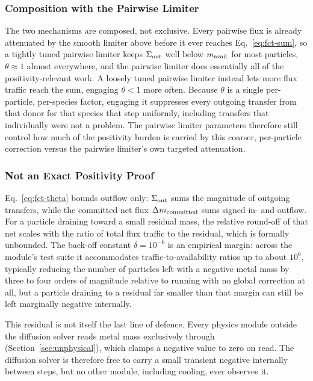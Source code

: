 \subsubsection{Composition with the Pairwise Limiter}
The two mechanisms are composed, not exclusive. Every pairwise flux is
already attenuated by the smooth limiter above before it ever reaches
Eq.~\eqref{eq:fct-sum}, so a tightly tuned pairwise limiter keeps
$\Sigma_{\rm out}$ well below $m_{\rm avail}$ for most particles,
$\theta\approx 1$ almost everywhere, and the pairwise limiter does
essentially all of the positivity-relevant work. A loosely tuned pairwise
limiter instead lets more flux traffic reach the sum, engaging $\theta<1$
more often. Because $\theta$ is a single per-particle, per-species factor,
engaging it suppresses every outgoing transfer from that donor for that
species that step uniformly, including transfers that individually were
not a problem. The pairwise limiter parameters therefore still control how
much of the positivity burden is carried by this coarser, per-particle
correction versus the pairwise limiter's own targeted attenuation.

\subsubsection{Not an Exact Positivity Proof}
Eq.~\eqref{eq:fct-theta} bounds outflow only: $\Sigma_{\rm out}$ sums the
magnitude of outgoing transfers, while the committed net flux
$\Delta m_{\rm committed}$ sums signed in- and outflow. For a particle
draining toward a small residual mass, the relative round-off of that net
scales with the ratio of total flux traffic to the residual, which is
formally unbounded. The back-off constant $\delta=10^{-6}$ is an empirical
margin: across the module's test suite it accommodates
traffic-to-availability ratios up to about $10^{6}$, typically reducing
the number of particles left with a negative metal mass by three to four
orders of magnitude relative to running with no global correction at all,
but a particle draining to a residual far smaller than that margin can
still be left marginally negative internally.

This residual is not itself the last line of defence. Every physics module
outside the diffusion solver reads metal mass exclusively through
(Section~\ref{sec:unphysical}), which clamps a negative value to zero on
read. The diffusion solver is therefore free to carry a small transient
negative internally between steps, but no other module, including
cooling, ever observes it.

